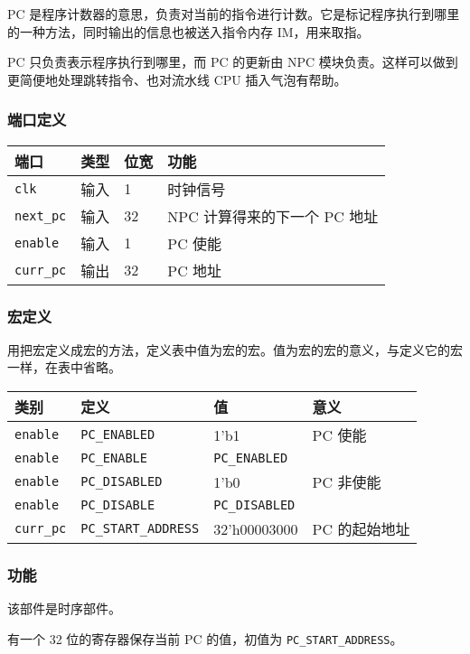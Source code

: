 PC
是程序计数器的意思，负责对当前的指令进行计数。它是标记程序执行到哪里的一种方法，同时输出的信息也被送入指令内存
IM，用来取指。

PC 只负责表示程序执行到哪里，而 PC 的更新由 NPC
模块负责。这样可以做到更简便地处理跳转指令、也对流水线 CPU
插入气泡有帮助。

\hypertarget{ux7aefux53e3ux5b9aux4e49}{%
\subsubsection{端口定义}\label{ux7aefux53e3ux5b9aux4e49}}

\begin{longtable}[]{@{}llll@{}}
\toprule
端口 & 类型 & 位宽 & 功能\tabularnewline
\midrule
\endhead
\texttt{clk} & 输入 & 1 & 时钟信号\tabularnewline
\texttt{next\_pc} & 输入 & 32 & NPC 计算得来的下一个 PC
地址\tabularnewline
\texttt{enable} & 输入 & 1 & PC 使能\tabularnewline
\texttt{curr\_pc} & 输出 & 32 & PC 地址\tabularnewline
\bottomrule
\end{longtable}

\hypertarget{ux5b8fux5b9aux4e49-1}{%
\subsubsection{宏定义}\label{ux5b8fux5b9aux4e49-1}}

用把宏定义成宏的方法，定义表中值为宏的宏。值为宏的宏的意义，与定义它的宏一样，在表中省略。

\begin{longtable}[]{@{}llll@{}}
\toprule
类别 & 定义 & 值 & 意义\tabularnewline
\midrule
\endhead
\texttt{enable} & \texttt{PC\_ENABLED} & 1'b1 & PC 使能\tabularnewline
\texttt{enable} & \texttt{PC\_ENABLE} & \texttt{PC\_ENABLED}
&\tabularnewline
\texttt{enable} & \texttt{PC\_DISABLED} & 1'b0 & PC
非使能\tabularnewline
\texttt{enable} & \texttt{PC\_DISABLE} & \texttt{PC\_DISABLED}
&\tabularnewline
\texttt{curr\_pc} & \texttt{PC\_START\_ADDRESS} & 32'h00003000 & PC
的起始地址\tabularnewline
\bottomrule
\end{longtable}

\hypertarget{ux529fux80fd-2}{%
\subsubsection{功能}\label{ux529fux80fd-2}}

该部件是时序部件。

有一个 32 位的寄存器保存当前 PC 的值，初值为
\texttt{PC\_START\_ADDRESS}。

